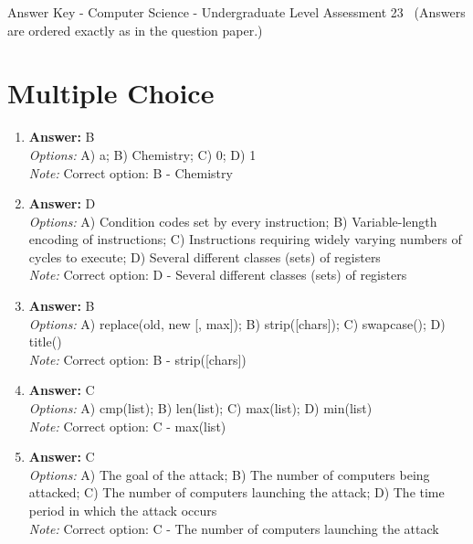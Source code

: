 \documentclass[12pt]{article}
\begin{document}
\begin{center}
Answer Key - Computer Science - Undergraduate Level Assessment 23 \
\small (Answers are ordered exactly as in the question paper.)
\end{center}

\section*{Multiple Choice}
\begin{enumerate}[label=\arabic*.]
\item \textbf{Answer:} B
\\ \textit{Options:} A) a; B) Chemistry; C) 0; D) 1
\\ \textit{Note:} Correct option: B - Chemistry
\item \textbf{Answer:} D
\\ \textit{Options:} A) Condition codes set by every instruction; B) Variable-length encoding of instructions; C) Instructions requiring widely varying numbers of cycles to execute; D) Several different classes (sets) of registers
\\ \textit{Note:} Correct option: D - Several different classes (sets) of registers
\item \textbf{Answer:} B
\\ \textit{Options:} A) replace(old, new [, max]); B) strip([chars]); C) swapcase(); D) title()
\\ \textit{Note:} Correct option: B - strip([chars])
\item \textbf{Answer:} C
\\ \textit{Options:} A) cmp(list); B) len(list); C) max(list); D) min(list)
\\ \textit{Note:} Correct option: C - max(list)
\item \textbf{Answer:} C
\\ \textit{Options:} A) The goal of the attack; B) The number of computers being attacked; C) The number of computers launching the attack; D) The time period in which the attack occurs
\\ \textit{Note:} Correct option: C - The number of computers launching the attack
\end{enumerate}
\end{document}
